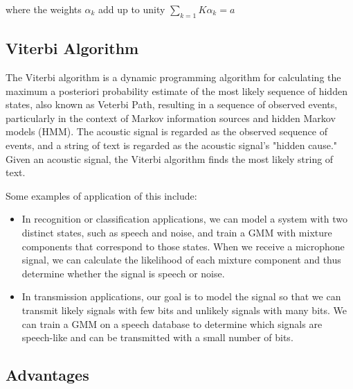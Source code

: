 where the weights $\alpha_{k}$ add up to unity $\sum_{k=1}{K} \alpha_{k} = a$

\subsection{Viterbi Algorithm}
The Viterbi algorithm is a dynamic programming algorithm for calculating the maximum a posteriori probability estimate of the most likely sequence of hidden states, also known as Veterbi Path, resulting in a sequence of observed events, particularly in the context of Markov information sources and hidden Markov models (HMM). The acoustic signal is regarded as the observed sequence of events, and a string of text is regarded as the acoustic signal's "hidden cause." Given an acoustic signal, the Viterbi algorithm finds the most likely string of text. \cite{muller_fundamentals_2021}

Some examples of application of this include:
\begin{itemize}
    \item In recognition or classification applications, we can model a system with two distinct states, such as speech and noise, and train a GMM with mixture components that correspond to those states. When we receive a microphone signal, we can calculate the likelihood of each mixture component and thus determine whether the signal is speech or noise.
    \item In transmission applications, our goal is to model the signal so that we can transmit likely signals with few bits and unlikely signals with many bits. We can train a GMM on a speech database to determine which signals are speech-like and can be transmitted with a small number of bits.
\end{itemize}

\subsection{Advantages}
\label{sub:traditional-asr-advantages}

